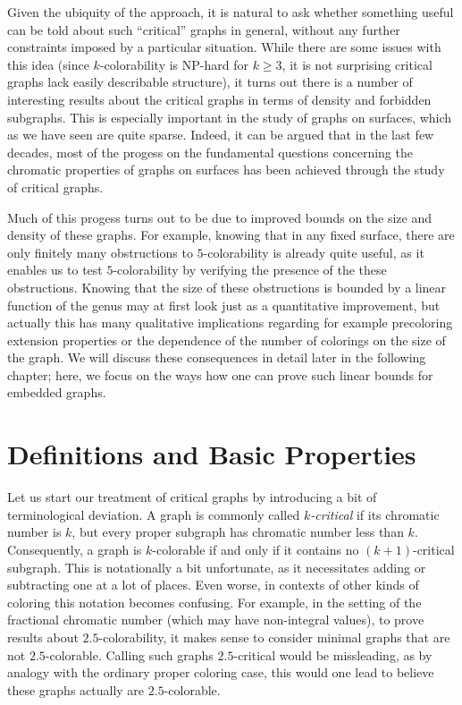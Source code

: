 \documentclass[12pt,twoside,openright,a4paper]{book}
\begin{document}
Given the ubiquity of the approach, it is natural to ask whether something 
useful can be told about such ``critical'' graphs in general, without any further
constraints imposed by a particular situation.  While there are some issues
with this idea (since $k$-colorability is NP-hard for $k\ge 3$, it is not surprising
critical graphs lack easily describable structure), it turns out there is a number
of interesting results about the critical graphs in terms of density and forbidden subgraphs.
This is especially important in the study of graphs on surfaces, which as we have
seen are quite sparse.  Indeed, it can be argued that in the last few decades,
most of the progess on the fundamental questions concerning the chromatic properties
of graphs on surfaces has been achieved through the study of critical graphs.

Much of this progess turns out to be due to improved bounds
on the size and density of these graphs.  For example, knowing that in any
fixed surface, there are only finitely many obstructions to $5$-colorability
is already quite useful, as it enables us to test $5$-colorability by verifying the
presence of the these obstructions.  Knowing that the size of these obstructions
is bounded by a linear function of the genus may at first look just as a quantitative improvement,
but actually this has many qualitative implications regarding for example precoloring extension
properties or the dependence of the number of colorings on the size of the graph.
We will discuss these consequences in detail later in the following chapter;
here, we focus on the ways how one can prove such linear bounds for embedded graphs.

\section{Definitions and Basic Properties}\label{sec:defbas}

Let us start our treatment of critical graphs by introducing a bit of terminological
deviation.  A graph is commonly called \emph{$k$-critical} if its chromatic number is $k$, but every
proper subgraph has chromatic number less than $k$.  Consequently, a graph is $k$-colorable
if and only if it contains no $(k+1)$-critical subgraph.  This is notationally a bit unfortunate,
as it necessitates adding or subtracting one at a lot of places.  Even worse, in contexts
of other kinds of coloring this notation becomes confusing.  For example, in the setting
of the fractional chromatic number (which may have non-integral values), to prove results
about $2.5$-colorability, it makes sense to consider minimal graphs that are not $2.5$-colorable.
Calling such graphs $2.5$-critical would be missleading, as by analogy with the ordinary
proper coloring case, this would one lead to believe these graphs actually are $2.5$-colorable.
\end{document}
